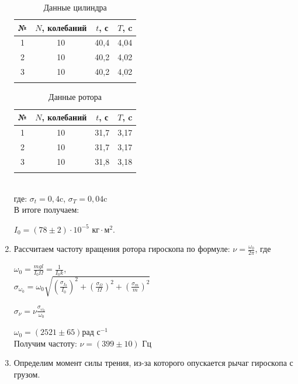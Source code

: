 \documentclass[a4paper, 12pt]{article}%
\begin{document}
\begin{enumerate}
	
	\begin{minipage}{0.4\textwidth}
		\begin{longtable}{|c|c|c|c|}
			\hline 
			№ & $N$, колебаний & $t$, с& $T$, c\\
			\hline
			1 & 10 & 40,4&4,04\\
			\hline
			2 &10 & 40,2&4,02\\
			\hline
			3 &10 & 40,2&4,02\\
			\hline
			\caption{Данные цилиндра}
		\end{longtable}
	\end{minipage}
	\begin{minipage}{0.4\textwidth}
		\begin{longtable}{|c|c|c|c|}
			\hline 
			№ & $N$, колебаний & $t$, с& $T$, c\\
			\hline
			1 & 10 & 31,7&3,17\\
			\hline
			2 &10 & 31,7&3,17\\
			\hline
			3 &10 & 31,8&3,18\\
			\hline
			\caption{Данные ротора}
		\end{longtable}
	\end{minipage}
	\\ где: $\sigma_t=0,4$c,  $\sigma_T=0,04$c\\
       В итоге получаем: 
	
		$I_0=(78\pm2)\cdot 10^{-5}\text{ кг} \cdot \text{м}^2.$
	

	\item Рассчитаем частоту вращения ротора гироскопа по формуле:	$\nu = \frac{\omega_0}{2\pi}$, где
	
	 $\omega_0 = \frac{mgl}{I_0\Omega} = \frac{1}{I_0 k}$, \\ 
	
	$\sigma_{\omega_0} = \omega_0\sqrt{\left( \frac{\sigma_{I_{\text{0}}}}{I_\text{0}} \right)^2 + \left( \frac{\sigma_{\Omega}}{\Omega} \right)^2+ \left( \frac{\sigma_{m}}{m} \right)^2 } $
	
	$	\sigma_\nu = \nu \frac{\sigma_{\omega_0}}{\omega_0}$
	
	$\omega_0 =\left( 2521 \pm 65 \right) \text{рад с}^{-1}$\\
	
	Получим частоту:  $\nu = \left( 399 \pm 10 \right) \text{ Гц}$
	
	
	
	\item Определим момент силы трения, из-за которого опускается рычаг гироскопа с грузом.
	

\end{enumerate}
\end{document}
